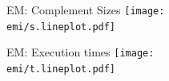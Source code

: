 \documentclass[12pt]{beamer}
\newcommand{\emi}{../results/figures/external/michel}
\begin{document}
\begin{frame}{EM: Complement Sizes}
\centering
\texttt{[image: \\emi/s.lineplot.pdf]}
\end{frame}

\begin{frame}{EM: Execution times}
\centering
\texttt{[image: \\emi/t.lineplot.pdf]}
\end{frame}
\end{document}
